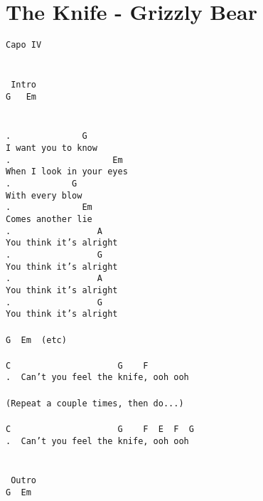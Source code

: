 \newpage
\section{The Knife - Grizzly Bear}
\label{The Knife - Grizzly Bear}
\texttt{Capo\ IV\\
\\
\\
\lbrack\ Intro\rbrack\\
G\ \ \ Em\\
\\
\\
.\ \ \ \ \ \ \ \ \ \ \ \ \ \ G\\
I\ want\ you\ to\ know\\
.\ \ \ \ \ \ \ \ \ \ \ \ \ \ \ \ \ \ \ \ Em\\
When\ I\ look\ in\ your\ eyes\\
.\ \ \ \ \ \ \ \ \ \ \ \ G\\
With\ every\ blow\\
.\ \ \ \ \ \ \ \ \ \ \ \ \ \ Em\\
Comes\ another\ lie\\
.\ \ \ \ \ \ \ \ \ \ \ \ \ \ \ \ \ A\\
You\ think\ it's\ alright\\
.\ \ \ \ \ \ \ \ \ \ \ \ \ \ \ \ \ G\\
You\ think\ it's\ alright\\
.\ \ \ \ \ \ \ \ \ \ \ \ \ \ \ \ \ A\\
You\ think\ it's\ alright\\
.\ \ \ \ \ \ \ \ \ \ \ \ \ \ \ \ \ G\\
You\ think\ it's\ alright\\
\\
G\ \ Em\ \ (etc)\\
\\
C\ \ \ \ \ \ \ \ \ \ \ \ \ \ \ \ \ \ \ \ \ G\ \ \ \ F\\
.\ \ Can't\ you\ feel\ the\ knife,\ ooh\ ooh\\
\\
(Repeat\ a\ couple\ times,\ then\ do...)\\
\\
C\ \ \ \ \ \ \ \ \ \ \ \ \ \ \ \ \ \ \ \ \ G\ \ \ \ F\ \ E\ \ F\ \ G\\
.\ \ Can't\ you\ feel\ the\ knife,\ ooh\ ooh\\
\\
\\
\lbrack\ Outro\rbrack\\
G\ \ Em}
